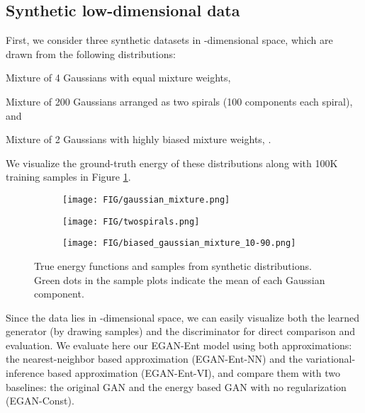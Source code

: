 \documentclass[a4paper]{article}
\begin{document}
\subsection{Synthetic low-dimensional data}
\label{sec:synthetic_exp}
First, we consider three synthetic datasets in -dimensional space,
which are drawn from the following distributions:
\begin{inlinelist}
\item Mixture of 4 Gaussians with equal mixture weights,
\item Mixture of 200 Gaussians arranged as two spirals (100 components each spiral), and 
\item Mixture of 2 Gaussians with highly biased mixture weights, .
\end{inlinelist}
We visualize the ground-truth energy of these distributions along with 100K training samples in Figure \ref{fig:synthetic_distributions}.
\begin{figure}[t!]
	\centering
	\begin{subfigure}{0.325\textwidth}
		\texttt{[image: FIG/gaussian\_mixture.png]}
	\end{subfigure}
    \begin{subfigure}{0.325\textwidth}
		\texttt{[image: FIG/twospirals.png]}
	\end{subfigure}
    \begin{subfigure}{0.325\textwidth}
		\texttt{[image: FIG/biased\_gaussian\_mixture\_10-90.png]}
	\end{subfigure}
	\caption{True energy functions and samples from synthetic distributions. Green dots in the sample plots indicate the mean of each Gaussian component.}
	\label{fig:synthetic_distributions}
\vspace{-0.6em}
\end{figure}
Since the data lies in -dimensional space, we can easily visualize both the learned generator (by drawing samples) and the discriminator for direct comparison and evaluation. 
We evaluate here our EGAN-Ent model using both approximations: the nearest-neighbor based approximation (EGAN-Ent-NN) and the variational-inference based approximation (EGAN-Ent-VI), and compare them with two baselines: the original GAN and the energy based GAN with no regularization (EGAN-Const).
\end{document}
